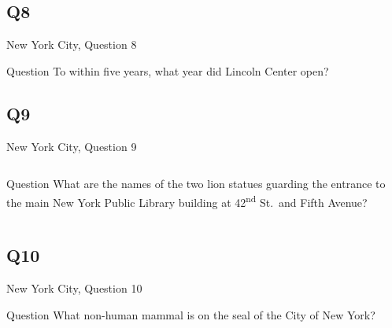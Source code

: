 \documentclass[11pt]{beamer}
\begin{document}
\subsection*{Q8}
\begin{frame}[t]{New York City, Question 8}
\begin{block}{Question}
To within five years, what year did Lincoln Center open?
\end{block}
\end{frame}
\subsection*{Q9}
\begin{frame}[t]{New York City, Question 9}
\begin{columns}[T,totalwidth=\linewidth]
\begin{column}{0.32\linewidth}
\begin{block}{Question}
What are the names of the two lion statues guarding the entrance to the main New York Public Library building at 42\textsuperscript{nd} St.\ and Fifth Avenue?
\end{block}
\end{column}
\begin{column}{0.65\linewidth}
\begin{center}
\texttt{[image: \{Images/nypl]}.jpg}
\end{center}
\end{column}
\end{columns}
\end{frame}
\subsection*{Q10}
\begin{frame}[t]{New York City, Question 10}
\begin{block}{Question}
What non-human mammal is on the seal of the City of New York?
\end{block}
\end{frame}
\end{document}
